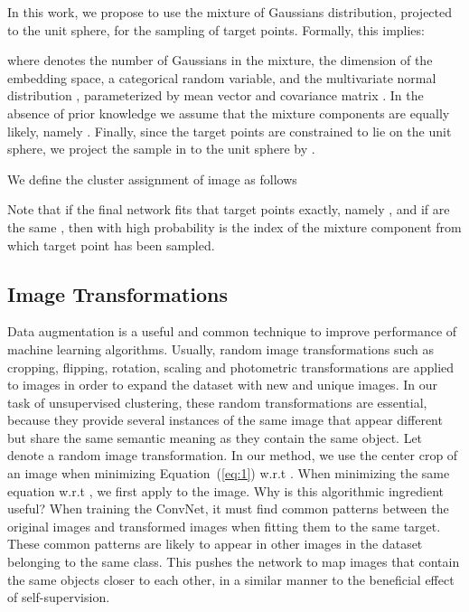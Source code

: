 \documentclass[a4paper,conference]{IEEEtran}
\begin{document}
In this work, we propose to use the mixture of Gaussians distribution, projected to the unit sphere, for the sampling of target points. Formally, this implies:

where  denotes the number of Gaussians in the mixture,  the dimension of the embedding space,   a categorical random variable, and   the multivariate normal distribution , parameterized by mean vector  and covariance matrix . In the absence of prior knowledge we assume that the mixture components are equally likely, namely . Finally, since the target points are constrained to lie on the unit sphere, we project the sample in  to the unit sphere by . 

We define the cluster assignment  of image  as follows

Note that if the final network  fits that target points exactly, namely , and if  are the same , then with high probability  is the index of the mixture component from which target point  has been sampled.

\subsection{Image Transformations}
Data augmentation is a useful and common technique to improve performance of machine learning algorithms. Usually, random image transformations such as cropping, flipping, rotation, scaling and photometric transformations are applied to images in order to expand the dataset with new and unique images. In our task of unsupervised clustering, these random transformations are essential, because they provide several instances of the same image that appear different but share the same semantic meaning as they contain the same object. Let  denote a random image transformation. In our method, we use the center crop of an image when minimizing Equation~(\ref{eq:1}) w.r.t . When minimizing the same equation w.r.t , we first apply  to the image. Why is this algorithmic ingredient useful? When training the ConvNet, it must find common patterns between the original images and transformed images when fitting them to the same target. These common patterns are likely to appear in other images in the dataset belonging to the same class. This pushes the network to map images that contain the same objects closer to each other, in a similar manner to the beneficial effect of self-supervision.
\end{document}
